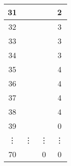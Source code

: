 \begin{table}[h]
{\begin{tabular}{|c|c|c|c|}
			\hline 
			31 &  &  & 2 \\ 
			\hline 
			32 &  &  & 3 \\ 
			\hline 
			33 &  &  & 3 \\ 
			\hline 
			34 &  &  & 3 \\ 
			\hline 
			35 &  &  & 4 \\ 
			\hline 
			36 &  &  & 4 \\ 
			\hline 
			37 &  &  & 4 \\ 
			\hline 
			38 &  &  & 4 \\ 
			\hline 
			39 &  &  & 0 \\ 
			\hline 
			\vdots & \vdots & \vdots & \vdots \\ 
			\hline
			70 &  & 0 & 0 \\
			\hline 
		\end{tabular}
	}
\end{table} 




